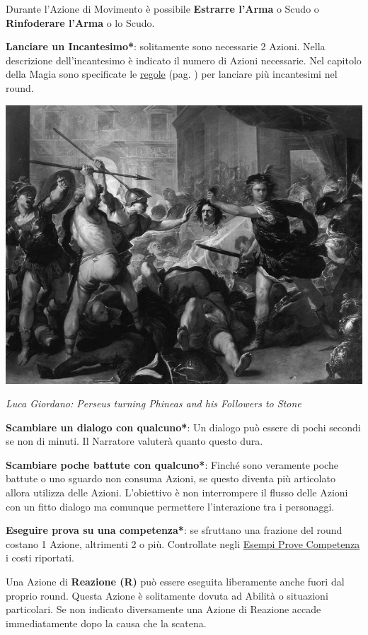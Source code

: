\begin{multicols}{2}
Durante l'Azione di Movimento è possibile \textbf{Estrarre l'Arma} o Scudo o \textbf{Rinfoderare l'Arma} o lo Scudo.

\textbf{Lanciare un Incantesimo*}: solitamente sono necessarie 2 Azioni. Nella descrizione dell'incantesimo è indicato il numero di Azioni necessarie. Nel capitolo della Magia sono specificate le \hyperlink{piumagieround}{regole} (pag. \pageref{piumagieround}) per lanciare più incantesimi nel round.

\begin{center}
	\includegraphics[width=0.9\linewidth]{immagini/Perseus_Fighting_Phineus_and_his_Companions.png}

	\emph{Luca Giordano: Perseus turning Phineas and his Followers to Stone}

\end{center}

\textbf{Scambiare un dialogo con qualcuno*}: Un dialogo può essere di pochi secondi se non di minuti. Il Narratore valuterà quanto questo dura.

\textbf{Scambiare poche battute con qualcuno*}: Finché sono veramente poche battute o uno sguardo non consuma Azioni, se questo diventa più articolato allora utilizza delle Azioni. L'obiettivo è non interrompere il flusso delle Azioni con un fitto dialogo ma comunque permettere l'interazione tra i personaggi.

\textbf{Eseguire prova su una competenza*}: se sfruttano una frazione del round costano 1 Azione, altrimenti 2 o più. Controllate negli \hyperlink{esempiprovecompetenze}{Esempi Prove Competenza} i costi riportati.

Una Azione di \textbf{Reazione (R)} può essere eseguita liberamente anche fuori dal proprio round. Questa Azione è solitamente dovuta ad Abilità o situazioni particolari. Se non indicato diversamente una Azione di Reazione accade immediatamente dopo la causa che la scatena.


\end{multicols}
